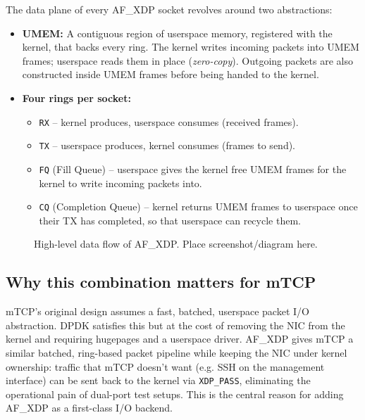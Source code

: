 \documentclass[10pt, letterpaper, twocolumn]{article}
\begin{document}
The data plane of every AF\_XDP socket revolves around two abstractions:

\begin{itemize}
    \item \textbf{UMEM:} A contiguous region of userspace memory, registered with the kernel, that backs every ring. The kernel writes incoming packets into UMEM frames; userspace reads them in place (\textit{zero-copy}). Outgoing packets are also constructed inside UMEM frames before being handed to the kernel.
    \item \textbf{Four rings per socket:}
    \begin{itemize}
        \item \texttt{RX} -- kernel produces, userspace consumes (received frames).
        \item \texttt{TX} -- userspace produces, kernel consumes (frames to send).
        \item \texttt{FQ} (Fill Queue) -- userspace gives the kernel free UMEM frames for the kernel to write incoming packets into.
        \item \texttt{CQ} (Completion Queue) -- kernel returns UMEM frames to userspace once their TX has completed, so that userspace can recycle them.
    \end{itemize}
\end{itemize}

\begin{figure}[htbp]
    \centering
    \caption{High-level data flow of AF\_XDP. Place screenshot/diagram here.}
    \label{fig:afxdp_overview}
\end{figure}
\FloatBarrier

\subsection{Why this combination matters for mTCP}

mTCP's original design assumes a fast, batched, userspace packet I/O abstraction. DPDK satisfies this but at the cost of removing the NIC from the kernel and requiring hugepages and a userspace driver. AF\_XDP gives mTCP a similar batched, ring-based packet pipeline while keeping the NIC under kernel ownership: traffic that mTCP doesn't want (e.g. SSH on the management interface) can be sent back to the kernel via \texttt{XDP\_PASS}, eliminating the operational pain of dual-port test setups. This is the central reason for adding AF\_XDP as a first-class I/O backend.
\end{document}
